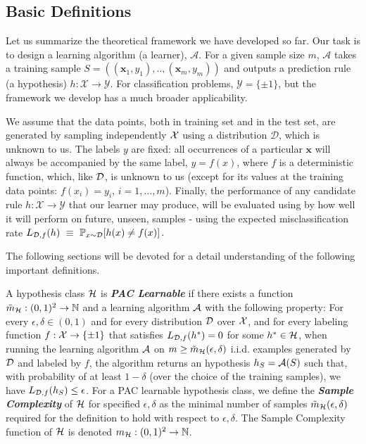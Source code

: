 {\subsection{Basic Definitions} \label{sec:frame}

Let us summarize the theoretical framework we have developed so far. Our task is to design a learning algorithm (a learner), $\mathcal{A}$. For a given sample size $m$, $\mathcal{A}$  takes a training sample $S=((\mathbf{x}_1,y_1),..,(\mathbf{x}_m,y_m))$ and outputs a prediction rule (a hypothesis)  $h: \mathcal{X}\to\mathcal{Y}$. 
For classification problems, $\mathcal{Y}=\{\pm 1\}$, but the framework we develop has a much broader applicability. 

We assume that the data points, both in training set and in the test set, are  generated by sampling independently $\mathcal{X}$ using a distribution  $\mathcal{D}$, which is unknown to us. The labels $y$ are fixed: all occurrences of a particular $\mathbf{x}$  will always be accompanied by the same label, $y=f(x)$, where $f$ is a deterministic function, which, like $\mathcal{D}$, is unknown to us (except for its values at the training data points: $ f(x_i)= y_i $, $i=1,\ldots,m$). Finally, the performance of any candidate rule $h:\mathcal{X}\to\mathcal{Y}$ that our learner may produce,  will be evaluated using by how well it will perform on future, unseen, samples - using the expected misclassification rate $L_{\mathcal{D},f}(h) ~\equiv ~ \mathbb{P}_{x \sim \mathcal{D}}[h(x) \neq f(x)] \,.$

The following sections will be devoted for a detail understanding of the following important definitions.

\begin{definition} \label{PAC Learnable}
	A hypothesis class $\mathcal{H}$ is \textit{\textbf{ PAC Learnable}} if there exists a function $\tilde{m}_{\mathcal{H}} : (0,1)^2 \to \mathbb{N}$ and a learning algorithm $\mathcal{A}$ with the following property:
	For every $\epsilon,\delta \in (0,1)$ and for every distribution $\mathcal{D}$ over $\mathcal{X}$, and for every labeling function $f:\mathcal{X}\to\{\pm 1\}$ that satisfies $L_{\mathcal{D},f}(h^*)=0$ for some $h^*\in\mathcal{H}$, when running the learning algorithm $\mathcal{A}$ on $m\ge \tilde{m}_{\mathcal{H}}(\epsilon,\delta)$ i.i.d. examples generated by $\mathcal{D}$ and labeled by $f$, the algorithm returns an hypothesis $h_S=\mathcal{A}(S)$ such that, with probability of at least $1-\delta$ (over the choice of the training samples), we have
	$
	L_{\mathcal{D}, f}(h_S) \le \epsilon
	$. 
	For a PAC learnable hypothesis class, we define the \textit{\textbf{ Sample  Complexity}} of $\mathcal{H}$ for specified $\epsilon,\delta$ as the minimal number of
	samples $\tilde{m}_{\mathcal{H}}(\epsilon,\delta)$ required for the definition to hold
	with respect to $\epsilon,\delta$. The Sample Complexity function of $\mathcal{H}$ is
	denoted $m_{\mathcal{H}}:(0,1)^2\to\mathbb{N}$.
\end{definition}

}
